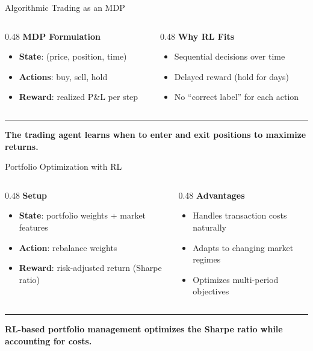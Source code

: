 \documentclass[8pt,aspectratio=169]{beamer}
\newcommand{\bottomnote}[1]{%
\vfill
\vspace{-2mm}
\textcolor{mllavender2}{\rule{\textwidth}{0.4pt}}
\vspace{1mm}
\footnotesize
\textbf{#1}
}
\newenvironment{compactlist}{%
  \begin{itemize}%
    \setlength{\itemsep}{2pt}%
    \setlength{\parskip}{0pt}%
    \setlength{\parsep}{0pt}%
}{%
  \end{itemize}%
}
\begin{document}
\begin{frame}{Algorithmic Trading as an MDP}
\begin{columns}[T]
\begin{column}{0.48\textwidth}
\textbf{MDP Formulation}
\begin{compactlist}
  \item \textbf{State}: (price, position, time)
  \item \textbf{Actions}: buy, sell, hold
  \item \textbf{Reward}: realized P\&L per step
\end{compactlist}
\end{column}
\begin{column}{0.48\textwidth}
\textbf{Why RL Fits}
\begin{compactlist}
  \item Sequential decisions over time
  \item Delayed reward (hold for days)
  \item No ``correct label'' for each action
\end{compactlist}
\end{column}
\end{columns}

\bottomnote{The trading agent learns when to enter and exit positions to maximize returns.}
\end{frame}

\begin{frame}{Portfolio Optimization with RL}
\begin{columns}[T]
\begin{column}{0.48\textwidth}
\textbf{Setup}
\begin{compactlist}
  \item \textbf{State}: portfolio weights + market features
  \item \textbf{Action}: rebalance weights
  \item \textbf{Reward}: risk-adjusted return (Sharpe ratio)
\end{compactlist}
\end{column}
\begin{column}{0.48\textwidth}
\textbf{Advantages}
\begin{compactlist}
  \item Handles transaction costs naturally
  \item Adapts to changing market regimes
  \item Optimizes multi-period objectives
\end{compactlist}
\end{column}
\end{columns}

\bottomnote{RL-based portfolio management optimizes the Sharpe ratio while accounting for costs.}
\end{frame}
\end{document}
